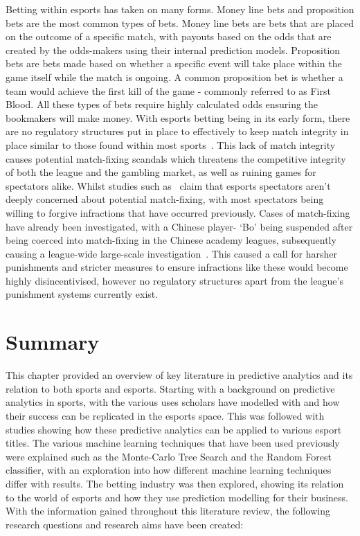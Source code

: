 Betting within esports has taken on many forms.
Money line bets and proposition bets are the most common types of bets.
Money line bets are bets that are placed on the outcome of a specific match, with payouts based on the odds that are created by the odds-makers using their internal prediction models.
Proposition bets are bets made based on whether a specific event will take place within the game itself while the match is ongoing.
A common proposition bet is whether a team would achieve the first kill of the game - commonly referred to as First Blood.
All these types of bets require highly calculated odds ensuring the bookmakers will make money.
With esports betting being in its early form, there are no regulatory structures put in place to effectively to keep match integrity in place similar to those found within most sports~\citep{dos2017q}.
This lack of match integrity causes potential match-fixing scandals which threatens the competitive integrity of both the league and the gambling market, as well as ruining games for spectators alike.
Whilst studies such as~\citet{abarbanel2019esports} claim that esports spectators aren't deeply concerned about potential match-fixing, with most spectators being willing to forgive infractions that have occurred previously.
Cases of match-fixing have already been investigated, with a Chinese player- `Bo' being suspended after being coerced into match-fixing in the Chinese academy leagues, subsequently causing a league-wide large-scale investigation~\citep{heath2021matchfixing}.
This caused a call for harsher punishments and stricter measures to ensure infractions like these would become highly disincentivised, however no regulatory structures apart from the league's punishment systems currently exist.

\section{Summary}\label{sec:Summary}
This chapter provided an overview of key literature in predictive analytics and its relation to both sports and esports.
Starting with a background on predictive analytics in sports, with the various uses scholars have modelled with and how their success can be replicated in the esports space.
This was followed with studies showing how these predictive analytics can be applied to various esport titles.
The various machine learning techniques that have been used previously were explained such as the Monte-Carlo Tree Search and the Random Forest classifier, with an exploration into how different machine learning techniques differ with results.
The betting industry was then explored, showing its relation to the world of esports and how they use prediction modelling for their business.
With the information gained throughout this literature review, the following research questions and research aims have been created:

